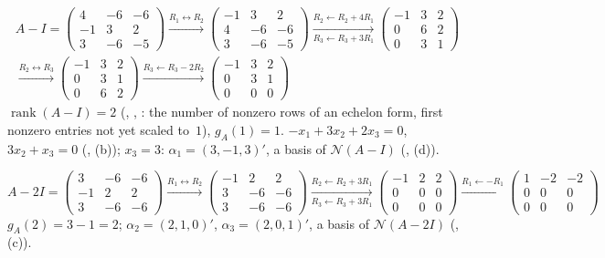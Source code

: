 \documentclass[12pt]{article}
\DeclareMathOperator{\rank}{rank}
\theoremstyle{definition}
\begin{document}
\begin{board}[\(\lambda=1\): echelon form of \(A-I\), then back substitution:]
\[
\begin{gathered}
A-I=\begin{pmatrix}4&-6&-6\\-1&3&2\\3&-6&-5\end{pmatrix}
\xrightarrow{R_1\leftrightarrow R_2}
\begin{pmatrix}-1&3&2\\4&-6&-6\\3&-6&-5\end{pmatrix}
\xrightarrow[R_3\leftarrow R_3+3R_1]{R_2\leftarrow R_2+4R_1}
\begin{pmatrix}-1&3&2\\0&6&2\\0&3&1\end{pmatrix}
\\
\xrightarrow{R_2\leftrightarrow R_3}
\begin{pmatrix}-1&3&2\\0&3&1\\0&6&2\end{pmatrix}
\xrightarrow{R_3\leftarrow R_3-2R_2}
\begin{pmatrix}-1&3&2\\0&3&1\\0&0&0\end{pmatrix}
\end{gathered}
\]
\(\rank(A-I)=2\) (, , : the number of nonzero rows of an echelon form, first nonzero
entries not yet scaled to~\(1\)), \(g_A(1)=1\). \(-x_1+3x_2+2x_3=0\), \(3x_2+x_3=0\) (,
(b)); \(x_3=3\): \(\alpha_1=(3,-1,3)'\), a basis of \(\mathcal N(A-I)\) (, (d)).
\end{board}
\begin{board}[\(\lambda=2\): reduce \(A-2I\); special solutions:]
\[
A-2I=\begin{pmatrix}3&-6&-6\\-1&2&2\\3&-6&-6\end{pmatrix}
\xrightarrow{R_1\leftrightarrow R_2}
\begin{pmatrix}-1&2&2\\3&-6&-6\\3&-6&-6\end{pmatrix}
\xrightarrow[R_3\leftarrow R_3+3R_1]{R_2\leftarrow R_2+3R_1}
\begin{pmatrix}-1&2&2\\0&0&0\\0&0&0\end{pmatrix}
\xrightarrow{R_1\leftarrow-R_1}
\begin{pmatrix}1&-2&-2\\0&0&0\\0&0&0\end{pmatrix}
\]
\(g_A(2)=3-1=2\); \(\alpha_2=(2,1,0)'\), \(\alpha_3=(2,0,1)'\), a basis of \(\mathcal N(A-2I)\) (,
(c)).
\end{board}
\end{document}
